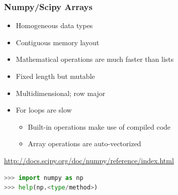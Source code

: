 \documentclass[xcolor=table,10pt,final]{beamer}
\begin{document}
\begin{frame}[fragile]
  \frametitle{Numpy/Scipy Arrays}
  \begin{itemize}
    \item Homogeneous data types
    \item Contiguous memory layout
    \item Mathematical operations are much faster than lists
    \item Fixed length but mutable
    \item Multidimensional; row major
    \item For loops are slow
      \begin{itemize}
        \item Built-in operations make use of compiled code
        \item Array operations are auto-vectorized
      \end{itemize}
  \end{itemize}
  \vskip0.5cm
  \url{http://docs.scipy.org/doc/numpy/reference/index.html}
  \vskip0.5cm
  \begin{lstlisting}[language=python]
>>> import numpy as np
>>> help(np.<type/method>)
  \end{lstlisting}
\end{frame}
\end{document}
